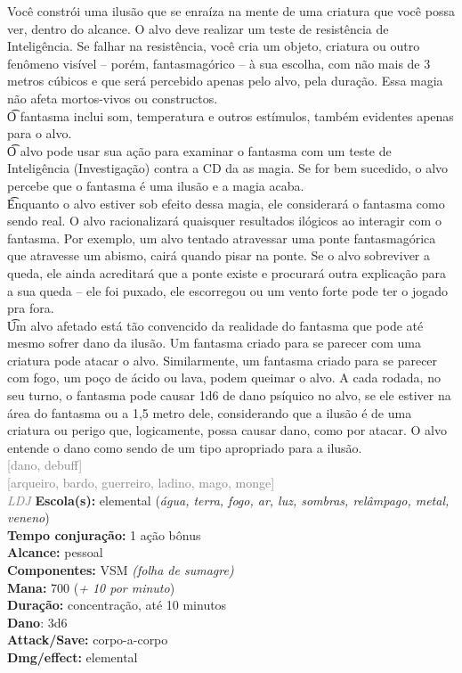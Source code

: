 \documentclass{RPG_Adventure}[2021/10/20]
\begin{document}
{\normalsize Você constrói uma ilusão que se enraíza na mente de uma criatura que você possa ver, dentro do alcance. O alvo deve realizar um teste de resistência de Inteligência. Se falhar na resistência, você cria um objeto, criatura ou outro fenômeno visível – porém, fantasmagórico – à sua escolha, com não mais de 3 metros cúbicos e que será percebido apenas pelo alvo, pela duração. Essa magia não afeta mortos-vivos ou constructos.\\\t O fantasma inclui som, temperatura e outros estímulos, também evidentes apenas para o alvo.\\\t O alvo pode usar sua ação para examinar o fantasma com um teste de Inteligência (Investigação) contra a CD da as magia. Se for bem sucedido, o alvo percebe que o fantasma é uma ilusão e a magia acaba.\\\t Enquanto o alvo estiver sob efeito dessa magia, ele considerará o fantasma como sendo real. O alvo racionalizará quaisquer resultados ilógicos ao interagir com o fantasma. Por exemplo, um alvo tentado atravessar uma ponte fantasmagórica que atravesse um abismo, cairá quando pisar na ponte. Se o alvo sobreviver a queda, ele ainda acreditará que a ponte existe e procurará outra explicação para a sua queda – ele foi puxado, ele escorregou ou um vento forte pode ter o jogado pra fora.\\\t Um alvo afetado está tão convencido da realidade do fantasma que pode até mesmo sofrer dano da ilusão. Um fantasma criado para se parecer com uma criatura pode atacar o alvo. Similarmente, um fantasma criado para se parecer com fogo, um poço de ácido ou lava, podem queimar o alvo. A cada rodada, no seu turno, o fantasma pode causar 1d6 de dano psíquico no alvo, se ele estiver na área do fantasma ou a 1,5 metro dele, considerando que a ilusão é de uma criatura ou perigo que, logicamente, possa causar dano, como por atacar. O alvo entende o dano como sendo de um tipo apropriado para a ilusão.\\}
{\scriptsize \textcolor{gray}{[dano, debuff]\\}}
{\scriptsize \textcolor{gray}{[arqueiro, bardo, guerreiro, ladino, mago, monge]\\}}
{\tiny \textcolor{gray}{\textit{LDJ}}}\jump{}
{\small \t \textbf{Escola(s):} elemental (\textit{água, terra, fogo, ar, luz, sombras, relâmpago, metal, veneno})\\\t \textbf{Tempo conjuração:} 1 ação bônus\\\t \textbf{Alcance:} pessoal\\\t \textbf{Componentes:} VSM \textit{(folha de sumagre)}\\\t \textbf{Mana:} 700 (\textit{+ 10 por minuto})\\\t \textbf{Duração:} concentração, até 10 minutos\\\t \textbf{Dano}: 3d6\\\t \textbf{Attack/Save:} corpo-a-corpo\\\t \textbf{Dmg/effect:} elemental\\}
\end{document}
